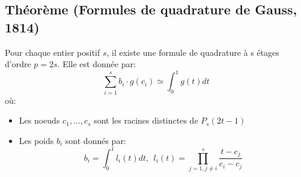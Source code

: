 \documentclass{article}
\begin{document}
\subsection{}
\subsection{Théorème (Formules de quadrature de Gauss, 1814)}
Pour chaque entier positif $s$, il existe une formule de quadrature à s étages d'ordre $p = 2s$. Elle est donnée par:
$$\sum_{i = 1}^{s} b_i \cdot g(c_i) \simeq \int_{0}^{1}g(t)dt$$
où:
\begin{itemize}
    \item Les noeuds $c_1, \dots, c_s$ sont les racines distinctes de $P_s(2t - 1)$
    \item Les poids $b_i$ sont donnés par:
    $$b_i = \int_{0}^{1}l_i(t)dt, \ \ l_i(t) = \prod_{j = 1, j \neq i}^{s}\frac{t - c_j}{c_i - c_j}$$
\end{itemize}
\end{document}
